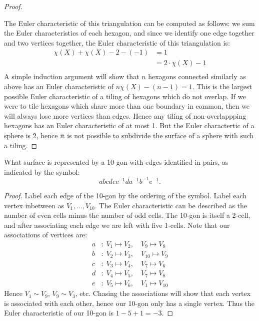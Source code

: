 \documentclass[10pt,oneside,openany]{memoir}
\begin{document}
\begin{proof}
\begin{center}
		\end{center}
		The Euler characteristic of this triangulation can be computed as follows: we sum the Euler characteristics of each hexagon, and since we identify one edge together and two vertices together, the Euler characteristic of this triangulation is:
		\begin{align*}
			\chi(X) + \chi(X) - 2 - (-1)
			&= 1 \\
			&= 2 \cdot \chi(X) - 1 \\
		\end{align*}
		A simple induction argument will show that $n$ hexagons connected similarly as above has an Euler characteristic of $n \chi(X) - (n-1) = 1$. This is the largest possible Euler characteristic of a tiling of hexagons which do not overlap. If we were to tile hexagons which share more than one boundary in common, then we will always lose more vertices than edges. Hence any tiling of non-overlappping hexagons has an Euler characteristic of at most 1. But the Euler charactertic of a sphere is 2, hence it is not possible to subdivide the surface of a sphere with such a tiling.
	\end{proof}
\begin{exercise}[manual-num={3}]
	What surface is represented by a 10-gon with edges identified in pairs, as indicated by the symbol:
	\[
		abcdec^{-1}da^{-1}b^{-1}e^{-1}.
	\] 
\end{exercise}
	\begin{proof}
		Label each edge of the 10-gon by the ordering of the symbol. Label each vertex inbetween as $V_1,\ldots,V_{10}$. The Euler characteristic can be described as the number of even cells minus the number of odd cells. The 10-gon is itself a 2-cell, and after associating each edge we are left with five 1-cells. Note that our associations of vertices are:
		\begin{align*}
a &: \; V_1 \mapsto V_2,\quad V_9 \mapsto V_8 \\
b &: \; V_2 \mapsto V_3,\quad V_{10} \mapsto V_9 \\
c &: \; V_3 \mapsto V_4,\quad V_7 \mapsto V_6 \\
d &: \; V_4 \mapsto V_5,\quad V_7 \mapsto V_8 \\
e &: \; V_5 \mapsto V_6,\quad V_1 \mapsto V_{10}
\end{align*}
		Hence $V_1 \sim V_9$, $V_9 \sim V_3$, etc. Chasing the associations will show that each vertex is associated with each other, hence our 10-gon only has a single vertex. Thus the Euler characteristic of our 10-gon is $1 - 5 + 1 = -3$.
	\end{proof}
\end{document}
